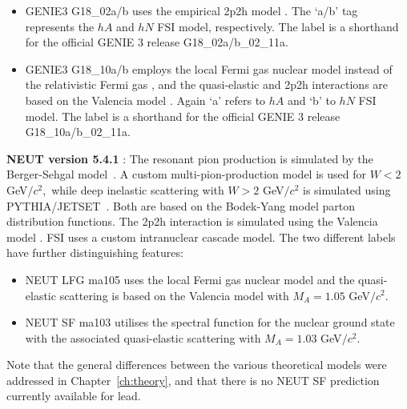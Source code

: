 \begin{itemize}
    \item GENIE3 G18\_02a/b uses the empirical 2p2h model \cite{genie_ANDREOPOULOS201087,katori2013meson}. The `a/b' tag represents the $hA$ and $hN$ FSI model, respectively. The label is a shorthand for the official GENIE 3 release G18\_02a/b\_02\_11a. 
    \item GENIE3 G18\_10a/b employs the local Fermi gas nuclear model \cite{RPANieves2004_PhysRevC.70.055503} instead of the relativistic Fermi gas \cite{RFG_SMITH1972605, 1975547}, and the quasi-elastic and 2p2h interactions are based on the Valencia model \cite{2p2hNieves2011_PhysRevC.83.045501}. Again `a' refers to $hA$ and `b' to $hN$ FSI model. The label is a shorthand for the official GENIE 3 release G18\_10a/b\_02\_11a. 
\end{itemize}

\vspace{5pt}
\noindent 
\textbf{NEUT version 5.4.1} \cite{Hayato:2009zz, HayatoPickering2021}: The resonant pion production is
simulated by the Berger-Sehgal model~\cite{PhysRevD.76.113004}. A custom multi-pion-production model is used for $W < 2$ GeV$/c^2$,~while deep inelastic scattering with $W > 2$ GeV$/c^2$ is simulated using PYTHIA/JETSET~\cite{Pythia_Sjostrand_2001}. Both are based on the Bodek-Yang model\cite{BodekYang_2003,BODEK2005113} parton distribution functions. The 2p2h interaction is simulated using the Valencia model \cite{2p2hNieves2011_PhysRevC.83.045501}. FSI uses a custom intranuclear cascade model. The two different labels have further distinguishing features:
\begin{itemize}
    \item NEUT LFG ma105 uses the local Fermi gas nuclear model \cite{RPANieves2004_PhysRevC.70.055503} and the quasi-elastic scattering is based on the Valencia model \cite{2p2hNieves2011_PhysRevC.83.045501, Bourguille_2021} with $M_{A} = 1.05$ GeV$/c^2$.
    \item NEUT SF ma103 utilises the spectral function for the nuclear ground state with the associated quasi-elastic scattering \cite{Benhar:1994hw, Juszczak_2006, Furmanski:2015knr} with $M_{A} = 1.03$ GeV$/c^2$.
\end{itemize}
\noindent Note that the general differences between the various theoretical models were addressed in Chapter~\ref{ch:theory}, and that there is no NEUT SF prediction currently available for lead.

